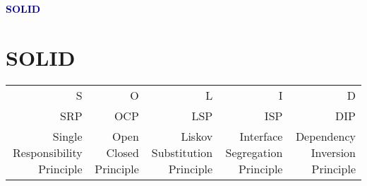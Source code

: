 \textbf{\textcolor{darkblue}{SOLID}}~
\section*{SOLID}
\begin{tabular}{r | r | r | r | r}
   S & O & L & I & D \\
  SRP & OCP & LSP & ISP & DIP \\
  Single Responsibility Principle & Open Closed Principle & Liskov Substitution Principle & Interface Segregation Principle & Dependency Inversion Principle
 \end{tabular}
 